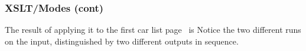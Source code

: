 %
\begin{frame}
\frametitle{XSLT/Modes (cont)}
 
The result of applying it to the first car list page~\pageref{cars} is
 Notice the two different runs on the
input, distinguished by two different outputs in sequence.

\end{frame}

